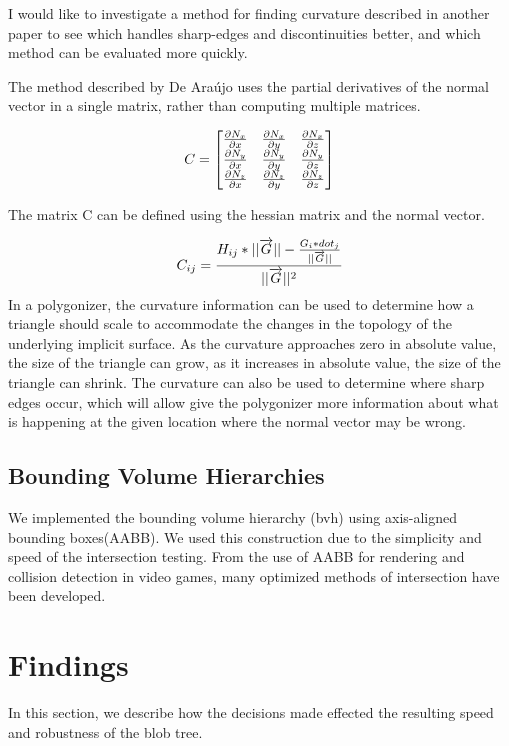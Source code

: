 \documentclass[conference]{acmsiggraph}
\begin{document}
I would like to investigate a method for finding curvature described in another
paper\cite{DeAraujo2004} to see which handles sharp-edges and discontinuities
better, and which method can be evaluated more quickly.

The method described by De Ara\'{u}jo uses the partial derivatives of the
normal vector in a single matrix, rather than computing multiple matrices.

$$
C=
\begin{bmatrix}
	{\partial N_x \over \partial x}&{\partial N_x \over \partial y}&{\partial N_x \over \partial z}\\
	{\partial N_y \over \partial x}&{\partial N_y \over \partial y}&{\partial N_y \over \partial z}\\
	{\partial N_z \over \partial x}&{\partial N_z \over \partial y}&{\partial N_z \over \partial z}
\end{bmatrix}
$$

The matrix C can be defined using the hessian matrix and the normal vector.

$$
C_{ij} = {H_{ij} * ||\overrightarrow{G}|| - {G_i * dot_j \over
	||\overrightarrow{G}||} \over ||\overrightarrow{G}||^2}
$$
In a polygonizer, the curvature information can be used to determine how a
triangle should scale to accommodate the changes in the topology of the
underlying implicit surface. As the curvature approaches zero in absolute value,
the size of the triangle can grow, as it increases in absolute value, the size
of the triangle can shrink. The curvature can also be used to determine where
sharp edges occur, which will allow give the polygonizer more information about
what is happening at the given location where the normal vector may be wrong.

\subsection{Bounding Volume Hierarchies}
We implemented the bounding volume hierarchy (bvh) using axis-aligned bounding
boxes(AABB). We used this construction due to the simplicity and speed of the
intersection testing. From the use of AABB for rendering and collision
detection in video games, many optimized methods of intersection have been
developed\cite{Williams}.


\section{Findings}
In this section, we describe how the decisions made effected the resulting
speed and robustness of the blob tree.
\end{document}
